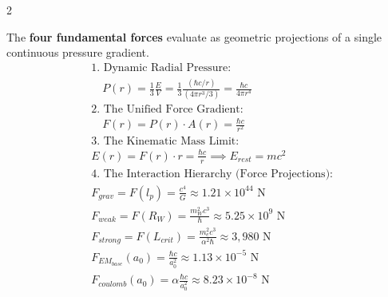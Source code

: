 \begin{multicols}{2}
\begin{tcolorbox}[cheatbox, title={\refstepcounter{cheatnum}\label{box:pressure_gradient}\thecheatnum. Continuous Pressure Dynamics \hfill\makebox[0pt][r]{\scriptsize\hyperref[sec:deriv_pressure_gradient]{[Proof $\downarrow$]}}}]
The \textbf{four fundamental forces} evaluate as geometric projections of a single continuous pressure gradient.
\begin{align}
    &\text{1. Dynamic Radial Pressure:} \nonumber \\
    &\quad P(r) = \frac{1}{3} \frac{E}{V} = \frac{1}{3} \frac{\left(\hbar c / r\right)}{\left(4\pi r^3 / 3\right)} = \frac{\hbar c}{4\pi r^4} \label{eq:pressure_thermo} \\
    &\text{2. The Unified Force Gradient:} \nonumber \\
    &\quad F(r) = P(r) \cdot A(r) = \frac{\hbar c}{r^2} \label{eq:pressure_gradient} \\
    &\text{3. The Kinematic Mass Limit:} \nonumber \\
    &E(r) = F(r) \cdot r = \frac{\hbar c}{r} \implies E_{rest} = mc^2 \label{eq:energy_2pi} \\
    &\text{4. The Interaction Hierarchy (Force Projections):} \nonumber \\
    &F_{grav} = F(l_p) = \frac{c^4}{G} \approx 1.21 \times 10^{44} \text{ N} \label{eq:force_gravity} \\
    &F_{weak} = F(R_W) = \frac{m_W^2 c^3}{\hbar} \approx 5.25 \times 10^9 \text{ N} \label{eq:force_weak} \\
    &F_{strong} = F(L_{crit}) = \frac{m_e^2 c^3}{\alpha^2 \hbar} \approx 3,980 \text{ N} \label{eq:force_strong} \\
    &F_{EM_{base}}(a_0) = \frac{\hbar c}{a_0^2} \approx  1.13 \times 10^{-5} \text{ N} \label{eq:force_em} \\
    &F_{coulomb}(a_0) = \alpha \frac{\hbar c}{a_0^2} \approx  8.23 \times 10^{-8} \text{ N} \label{eq:force_coulomb}
\end{align}
\end{tcolorbox}


\end{multicols}

